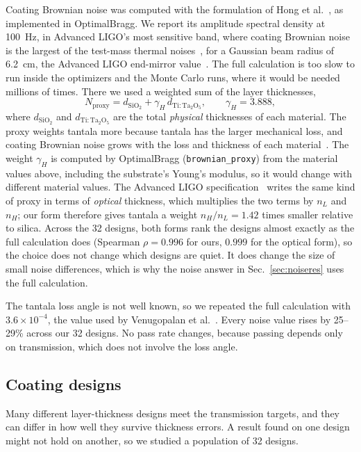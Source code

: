 Coating Brownian noise was computed with the formulation of Hong et al.~\cite{Hong2013}, as implemented in OptimalBragg. We report its amplitude spectral density at 100~Hz, in Advanced LIGO's most sensitive band, where coating Brownian noise is the largest of the test-mass thermal noises~\cite{aLIGO2015}, for a Gaussian beam radius of 6.2~cm, the Advanced LIGO end-mirror value~\cite{aLIGO2015}. The full calculation is too slow to run inside the optimizers and the Monte Carlo runs, where it would be needed millions of times. There we used a weighted sum of the layer thicknesses,
\begin{equation}
N_{\mathrm{proxy}} = d_{\mathrm{SiO_2}} + \gamma_H\, d_{\mathrm{Ti:Ta_2O_5}}, \qquad \gamma_H = 3.888,
\label{eq:proxy}
\end{equation}
where $d_{\mathrm{SiO_2}}$ and $d_{\mathrm{Ti:Ta_2O_5}}$ are the total \emph{physical} thicknesses of each material. The proxy weights tantala more because tantala has the larger mechanical loss, and coating Brownian noise grows with the loss and thickness of each material~\cite{Harry2002,Harry2007}. The weight $\gamma_H$ is computed by OptimalBragg (\texttt{brownian\_proxy}) from the material values above, including the substrate's Young's modulus, so it would change with different material values. The Advanced LIGO specification~\cite{E0900068} writes the same kind of proxy in terms of \emph{optical} thickness, which multiplies the two terms by $n_L$ and $n_H$; our form therefore gives tantala a weight $n_H/n_L = 1.42$ times smaller relative to silica. Across the 32 designs, both forms rank the designs almost exactly as the full calculation does (Spearman $\rho = 0.996$ for ours, $0.999$ for the optical form), so the choice does not change which designs are quiet. It does change the size of small noise differences, which is why the noise answer in Sec.~\ref{sec:noiseres} uses the full calculation.

The tantala loss angle is not well known, so we repeated the full calculation with $3.6\times10^{-4}$, the value used by Venugopalan et al.~\cite{Venugopalan2024}. Every noise value rises by 25--29\% across our 32 designs. No pass rate changes, because passing depends only on transmission, which does not involve the loss angle.

\subsection{Coating designs}

Many different layer-thickness designs meet the transmission targets, and they can differ in how well they survive thickness errors. A result found on one design might not hold on another, so we studied a population of 32 designs.

